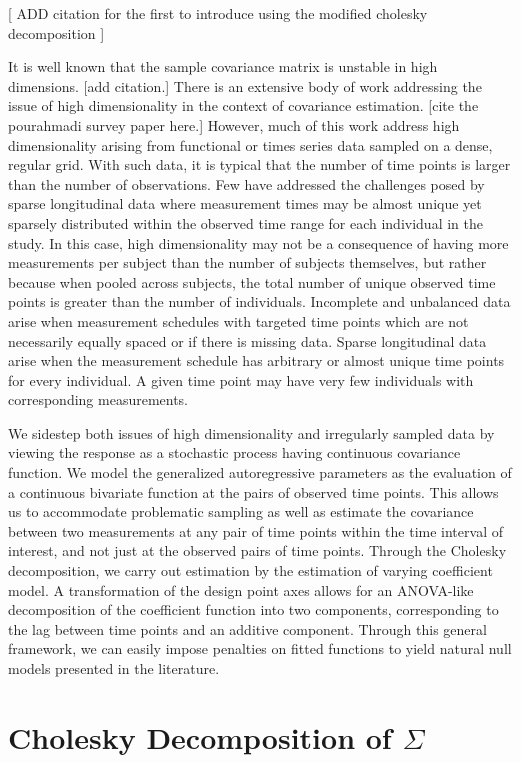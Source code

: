 \documentclass[12pt]{article}
\theoremstyle{definition}
\begin{document}
[ ADD citation for the first to introduce using the modified cholesky decomposition ]

It is well known that the sample covariance matrix is unstable in high dimensions. [add citation.]  There is an extensive body of work addressing the issue of high dimensionality in the context of covariance estimation. [cite the pourahmadi survey paper here.] However, much of this work address high dimensionality arising from functional or times series data sampled on a dense, regular grid. With such data, it is typical that the number of time points is larger than the number of observations. Few have addressed the challenges posed by sparse longitudinal data where measurement times may be almost unique yet sparsely distributed within the observed time range for each individual in the study. In this case, high dimensionality may not be a consequence of having more measurements per subject than the number of subjects themselves, but rather because when pooled across subjects, the total number of unique observed time points is greater than the number of individuals. Incomplete and unbalanced data arise when measurement schedules with targeted time points which are not necessarily equally spaced or if there is missing data. Sparse longitudinal data arise when the measurement schedule has arbitrary or almost unique time points for every individual. A given time point may have very few individuals with corresponding measurements. 

We sidestep both issues of high dimensionality and irregularly sampled data by viewing the response as a stochastic process having continuous covariance function. We model the generalized autoregressive parameters as the evaluation of a continuous bivariate function at the pairs of observed time points. This allows us to accommodate problematic sampling as well as estimate the covariance between two measurements at any pair of time points within the time interval of interest, and not just at the observed pairs of time points. Through the Cholesky decomposition, we carry out estimation by the estimation of varying coefficient model. A transformation of the design point axes allows for an ANOVA-like decomposition of the coefficient function into two components, corresponding to the lag between time points and an additive component. Through this general framework, we can easily impose penalties on fitted functions to yield natural null models presented in the literature. 


\section{Cholesky Decomposition of $\Sigma$}
\end{document}
